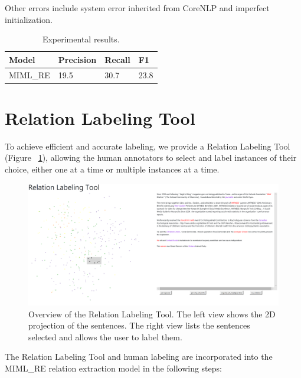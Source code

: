 \documentclass[11pt,a4paper]{article}
\begin{document}
    Other errors include system error inherited from CoreNLP and imperfect initialization. 
\begin{table}[]\label{table:results}
\center
\caption{Experimental results.}
\begin{tabular}{|l|l|l|l|}
\hline
Model    & Precision & Recall & F1   \\ \hline
MIML\_RE & 19.5      & 30.7   & 23.8 \\ \hline
\end{tabular}
\end{table}

\section{Relation Labeling Tool}
	To achieve efficient and accurate labeling, we provide a Relation Labeling Tool (Figure ~\ref{fig:1}), allowing the human annotators to select and label instances of their choice, either one at a time or multiple instances at a time.
	
\begin{figure}[!htbp]
  \includegraphics[width=\linewidth]{1.PNG}
  \caption{Overview of the Relation Labeling Tool. The left view shows the 2D projection of the sentences. The right view lists the sentences selected and allows the user to label them.}
  \label{fig:1}
\end{figure}
	
	The Relation Labeling Tool and human labeling are incorporated into the MIML\_RE relation extraction model in the following steps:
	
\end{document}
